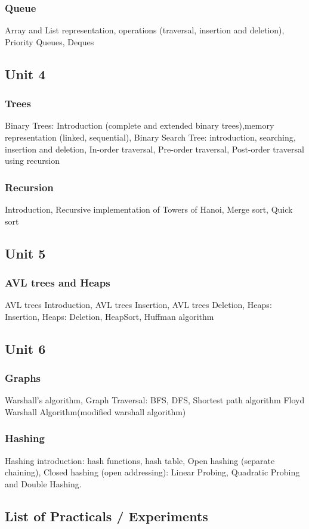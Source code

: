 \documentclass[twocolumn]{article}
\begin{document}
    \subsubsection*{Queue}
    Array and List representation, operations (traversal, insertion and deletion), Priority Queues, Deques
    \subsection*{Unit 4}
    \subsubsection*{Trees}
    Binary Trees: Introduction (complete and extended binary trees),memory representation (linked, sequential), Binary Search Tree: introduction, searching, insertion and deletion, In-order traversal, Pre-order traversal, Post-order traversal using recursion
    \subsubsection*{Recursion}
    Introduction, Recursive implementation of Towers of Hanoi, Merge sort, Quick sort
    \subsection*{Unit 5}
    \subsubsection*{AVL trees and Heaps}
    AVL trees Introduction, AVL trees Insertion, AVL trees Deletion, Heaps: Insertion, Heaps: Deletion, HeapSort, Huffman algorithm
    \subsection*{Unit 6}
    \subsubsection*{Graphs}
    Warshall's algorithm, Graph Traversal: BFS, DFS, Shortest path algorithm Floyd Warshall Algorithm(modified warshall algorithm)
    \subsubsection*{Hashing}
    Hashing introduction: hash functions, hash table, Open hashing (separate chaining), Closed hashing (open addressing): Linear Probing, Quadratic Probing and Double Hashing.
    \subsection*{List of Practicals / Experiments}
\end{document}
